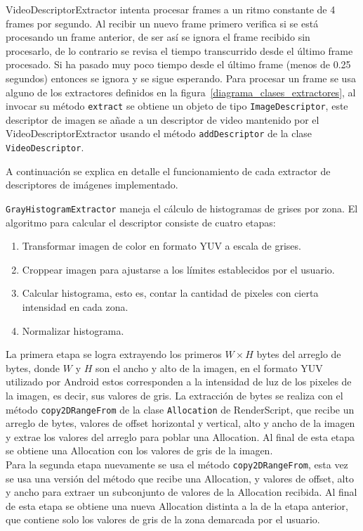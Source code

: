 VideoDescriptorExtractor intenta procesar frames a un ritmo constante de 4 frames por segundo. Al recibir un nuevo frame primero verifica si se está procesando un frame anterior, de ser así se ignora el frame recibido sin procesarlo, de lo contrario se revisa el tiempo transcurrido desde el último frame procesado. Si ha pasado muy poco tiempo desde el último frame (menos de 0.25 segundos) entonces se ignora y se sigue esperando. Para procesar un frame se usa alguno de los extractores definidos en la figura~\ref{diagrama_clases_extractores}, al invocar su método \texttt{extract} se obtiene un objeto de tipo \texttt{ImageDescriptor}, este descriptor de imagen se añade a un descriptor de video mantenido por el VideoDescriptorExtractor usando el método \texttt{addDescriptor} de la clase \texttt{VideoDescriptor}.

A continuación se explica en detalle el funcionamiento de cada extractor de descriptores de imágenes implementado.

\texttt{GrayHistogramExtractor} maneja el cálculo de histogramas de grises por zona. El algoritmo para calcular el descriptor consiste de cuatro etapas:
\begin{enumerate}
\item Transformar imagen de color en formato YUV a escala de grises.
\item Croppear imagen para ajustarse a los límites establecidos por el usuario.
\item Calcular histograma, esto es, contar la cantidad de pixeles con cierta intensidad en cada zona.
\item Normalizar histograma.
\end{enumerate}

La primera etapa se logra extrayendo los primeros $W\times H$ bytes del arreglo de bytes, donde $W$ y $H$ son el ancho y alto de la imagen, en el formato YUV utilizado por Android estos corresponden a la intensidad de luz de los pixeles de la imagen, es decir, sus valores de gris. La extracción de bytes se realiza con el método \texttt{copy2DRangeFrom} de la clase \texttt{Allocation} de RenderScript, que recibe un arreglo de bytes, valores de offset horizontal y vertical, alto y ancho de la imagen y extrae los valores del arreglo para poblar una Allocation. Al final de esta etapa se obtiene una Allocation con los valores de gris de la imagen. \\

Para la segunda etapa nuevamente se usa el método \texttt{copy2DRangeFrom}, esta vez se usa una versión del método que recibe una Allocation, y valores de offset, alto y ancho para extraer un subconjunto de valores de la Allocation recibida. Al final de esta etapa se obtiene una nueva Allocation distinta a la de la etapa anterior, que contiene solo los valores de gris de la zona demarcada por el usuario.\\

